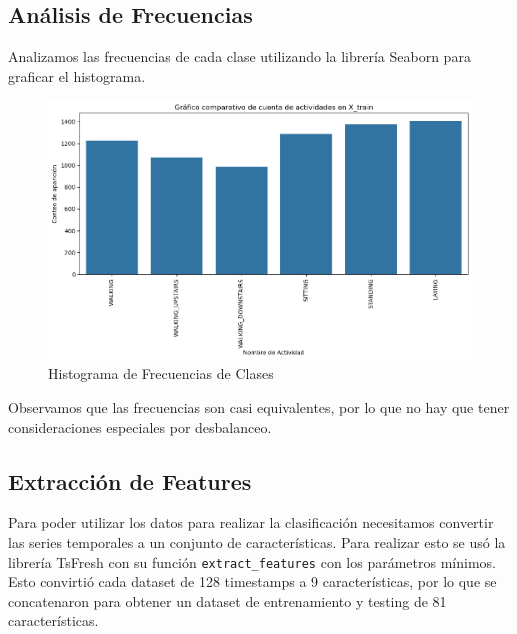 \documentclass[conference]{IEEEtran}
\begin{document}
\subsection{Análisis de Frecuencias}
Analizamos las frecuencias de cada clase utilizando la librería Seaborn para graficar el histograma.
\begin{figure}
    \centering
    \includegraphics[width=\linewidth]{class_freq.png}
    \caption{Histograma de Frecuencias de Clases}
    \label{fig1}
\end{figure}
Observamos que las frecuencias son casi equivalentes, por lo que no hay que tener consideraciones especiales por desbalanceo.

\subsection{Extracción de Features}
Para poder utilizar los datos para realizar la clasificación necesitamos convertir las series temporales a un conjunto de características. Para realizar esto se usó la librería TsFresh con su función \texttt{extract\_features} con los parámetros mínimos. Esto convirtió cada dataset de 128 timestamps a 9 características, por lo que se concatenaron para obtener un dataset de entrenamiento y testing de 81 características.
\end{document}
